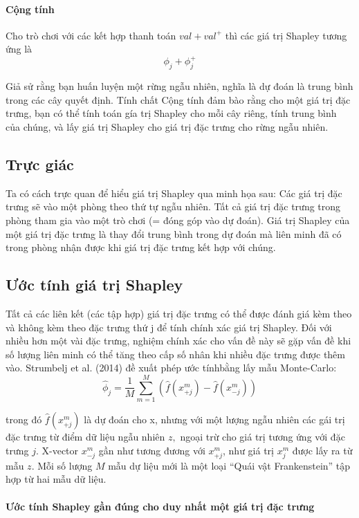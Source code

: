 \paragraph{Cộng tính}

Cho trò chơi với các kết hợp thanh toán $val + val^+$ thì các giá trị Shapley tương ứng là  
$$ \phi_j+\phi_j^{+}$$

Giả sử rằng bạn huấn luyện một rừng ngẫu nhiên, nghĩa là dự đoán là trung bình trong các cây quyết định. Tính chất Cộng tính đảm bào rằng cho một giá trị đặc trưng, bạn có thể tính toán gía trị Shapley cho mỗi cây riêng, tính trung bình của chúng, và lấy giá trị Shapley cho giá trị đặc trưng cho rừng ngẫu nhiên. 


\subsection{Trực giác}
Ta có cách trực quan để hiểu giá trị Shapley qua minh họa sau: Các giá trị đặc trưng sẽ vào một phòng theo thứ tự ngẫu nhiên. Tất cả giá trị đặc trưng trong phòng tham gia vào một trò chơi (= đóng góp vào dự đoán). Giá trị Shapley của một giá trị đặc trưng là thay đổi trung bình trong dự đoán mà liên minh đã có trong phòng nhận được khi giá trị đặc trưng kết hợp với chúng.

\subsection{ Ước tính giá trị Shapley}
Tất cả các liên kết (các tập hợp) giá trị đặc trưng có thể được đánh giá kèm theo và không kèm theo đặc trưng thứ j để tính chính xác giá trị Shapley. Đối với nhiều hơn một vài đặc trưng, nghiệm chính xác cho vấn đề này sẽ gặp vấn đề khi số lượng liên minh có thể tăng theo cấp số nhân khi nhiều đặc trưng được thêm vào. Strumbelj et al. (2014) đề xuất phép ước tínhbằng lấy mẫu Monte-Carlo:
$$ \hat{\phi}_{j}=\frac{1}{M}\sum_{m=1}^M\left(\hat{f}(x^{m}_{+j})-\hat{f}(x^{m}_{-j})\right)$$

trong đó $\hat{f}(x^{m}_{+j})$ là dự đoán cho x, nhưng với một lượng ngẫu nhiên các gái trị đặc trưng từ điểm dữ liệu ngẫu nhiên $z,$ ngoại trừ cho giá trị tương ứng với đặc trưng $j$. X-vector $x^{m}_{-j}$ gần như tương đương với $x^{m}_{+j}$, như giá trị $x^{m}_{j}$ được lấy ra từ mẫu $z$. Mỗi số lượng $M$ mẫu dự liệu mới là một loại “Quái vật Frankenstein” tập hợp từ hai mẫu dữ liệu.

\paragraph{Ước tính Shapley gần đúng cho duy nhất một giá trị đặc trưng}

